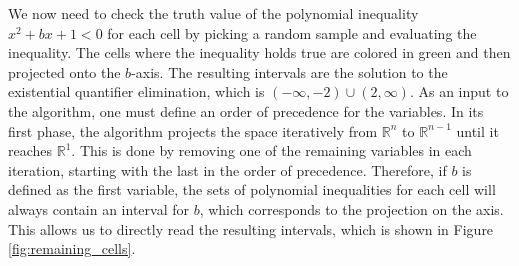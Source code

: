 We now need to check the truth value of the polynomial inequality $x^2 + bx + 1 < 0$ for each cell by picking a random sample and evaluating the
inequality.
The cells where the inequality holds true are colored in green and then projected onto the $b$-axis.
The resulting intervals are the solution to the existential quantifier elimination, which is $(-\infty, -2) \cup (2, \infty)$.
As an input to the algorithm, one must define an order of precedence for the variables.
In its first phase, the algorithm projects the space iteratively from $\mathbb{R}^n$ to $\mathbb{R}^{n-1}$ until it reaches $\mathbb{R}^1$.
This is done by removing one of the remaining variables in each iteration, starting with the last in the order of precedence.
Therefore, if $b$ is defined as the first variable, the sets of polynomial inequalities for each cell will always contain an interval for $b$, which
corresponds to the projection on the axis.
This allows us to directly read the resulting intervals, which is shown in Figure \ref{fig:remaining_cells}.

